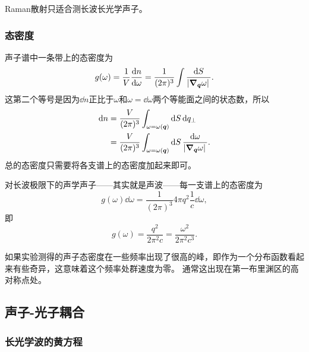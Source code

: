 \documentclass[hyperref, UTF8, a4paper]{ctexart}
\begin{document}
Raman散射只适合测长波长光学声子。

\subsubsection{态密度}

声子谱中一条带上的态密度为
\begin{equation}
    g(\omega) = \frac{1}{V} \dv{n}{\omega} = \frac{1}{(2\pi)^3} \int \frac{\dd{S}}{\abs*{\grad_{\vb*{q}} \omega}}.
\end{equation}
这第二个等号是因为$\dd{n}$正比于$\omega$和$\omega = \dd{\omega}$两个等能面之间的状态数，所以
\[
    \begin{aligned}
        \dd{n} &= \frac{V}{(2\pi)^3} \int_{\omega=\omega(\vb*{q})} \dd{S} \dd{q_\bot} \\
        &= \frac{V}{(2\pi)^3} \int_{\omega=\omega(\vb*{q})} \dd{S} \frac{\dd{\omega}}{\abs*{\grad_{\vb*{q}} \omega}}.
    \end{aligned}
\]
总的态密度只需要将各支谱上的态密度加起来即可。

对长波极限下的声学声子——其实就是声波——每一支谱上的态密度为
\[
    g(\omega) \dd{\omega} = \frac{1}{(2\pi)^3} 4\pi q^2 \frac{1}{c} \dd{\omega},
\]
即
\begin{equation}
    g(\omega) = \frac{q^2}{2\pi^2 c} = \frac{\omega^2}{2\pi^2 c^3}.
\end{equation}

如果实验测得的声子态密度在一些频率出现了很高的峰，即作为一个分布函数看起来有些奇异，这意味着这个频率处群速度为零。
通常这出现在第一布里渊区的高对称点处。%

\subsection{声子-光子耦合}

\subsubsection{长光学波的黄方程}\label{sec:huang-eq}
\end{document}
